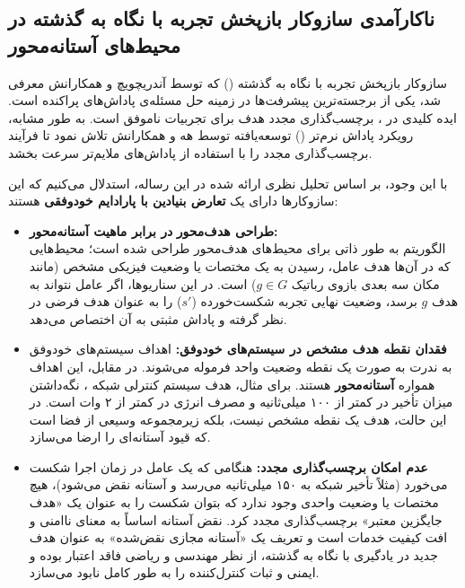 \documentclass[oneside,openany,phd]{TMU-Thesis}
\begin{document}
\subsection{ناکارآمدی سازوکار بازپخش تجربه با نگاه به گذشته در محیط‌های آستانه‌محور}
\label{sec:ch3_her_inefficiency}

سازوکار بازپخش تجربه با نگاه به گذشته () که توسط آندریچویچ و همکارانش \cite{andrychowicz2017her} معرفی شد، یکی از برجسته‌ترین پیشرفت‌ها در زمینه حل مسئله‌ی پاداش‌های پراکنده است. ایده کلیدی در ، برچسب‌گذاری مجدد هدف برای تجربیات ناموفق است. به طور مشابه، رویکرد پاداش نرم‌تر () توسعه‌یافته توسط هه و همکارانش \cite{he2020softher} تلاش نمود تا فرآیند برچسب‌گذاری مجدد را با استفاده از پاداش‌های ملایم‌تر سرعت بخشد.

با این وجود، بر اساس تحلیل نظری ارائه شده در این رساله، استدلال می‌کنیم که این سازوکارها دارای یک \textbf{تعارض بنیادین با پارادایم خودوفقی} هستند:
\begin{itemize}
    \item \textbf{طراحی هدف‌محور} \textbf{در برابر ماهیت آستانه‌محور:} \\
    الگوریتم  به طور ذاتی برای محیط‌های هدف‌محور طراحی شده است؛ محیط‌هایی که در آن‌ها هدف عامل، رسیدن به یک مختصات یا وضعیت فیزیکی مشخص (مانند مکان سه بعدی بازوی رباتیک $g \in G$) است. در این سناریوها، اگر عامل نتواند به هدف $g$ برسد،  وضعیت نهایی تجربه شکست‌خورده ($s'$) را به عنوان هدف فرضی در نظر گرفته و پاداش مثبتی به آن اختصاص می‌دهد.
    \item \textbf{فقدان نقطه هدف مشخص در سیستم‌های خودوفق:} اهداف سیستم‌های خودوفق به ندرت به صورت یک نقطه وضعیت واحد فرموله می‌شوند. در مقابل، این اهداف همواره \textbf{آستانه‌محور} هستند. برای مثال، هدف سیستم کنترلی شبکه ، نگه‌داشتن میزان تأخیر در کمتر از ۱۰۰ میلی‌ثانیه و مصرف انرژی در کمتر از ۲ وات است. در این حالت، هدف یک نقطه مشخص نیست، بلکه زیرمجموعه وسیعی از فضا است که قیود آستانه‌ای را ارضا می‌سازد.
    \item \textbf{عدم امکان برچسب‌گذاری مجدد:} هنگامی که یک عامل در زمان اجرا شکست می‌خورد (مثلاً تأخیر شبکه به ۱۵۰ میلی‌ثانیه می‌رسد و آستانه نقض می‌شود)، هیچ مختصات یا وضعیت واحدی وجود ندارد که بتوان شکست را به عنوان یک «هدف جایگزین معتبر» برچسب‌گذاری مجدد کرد. نقض آستانه اساساً به معنای ناامنی و افت کیفیت خدمات است و تعریف یک «آستانه مجازی نقض‌شده» به عنوان هدف جدید در یادگیری با نگاه به گذشته، از نظر مهندسی و ریاضی فاقد اعتبار بوده و ایمنی و ثبات کنترل‌کننده را به طور کامل نابود می‌سازد.
\end{itemize}
\end{document}
